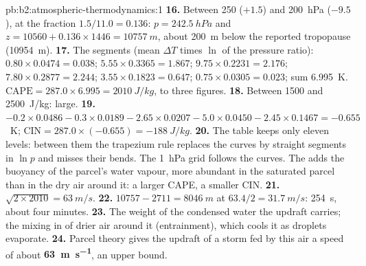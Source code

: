 \begin{solution}{pb:b2:atmospheric-thermodynamics:1}
\textbf{16.} Between 250 ($+1.5$) and \qty{200}{hPa} ($-9.5$), at the fraction $1.5/11.0 =
0.136$: $p = \qty{242.5}{hPa}$ and $z = 10560 + 0.136 \times 1446 = \qty{10757}{m}$, about
\qty{200}{m} below the reported tropopause (\qty{10954}{m}).
\textbf{17.} The segments (mean $\Delta T$ times $\ln$ of the pressure ratio): $0.80 \times 0.0474
= 0.038$; $5.55 \times 0.3365 = 1.867$; $9.75 \times 0.2231 = 2.176$; $7.80 \times 0.2877 =
2.244$; $3.55 \times 0.1823 = 0.647$; $0.75 \times 0.0305 = 0.023$; sum \qty{6.995}{K}.
$\text{CAPE} = 287.0 \times 6.995 = \qty{2010}{J/kg}$, to three figures.
\textbf{18.} Between 1500 and \qty{2500}{J/kg}: large.
\textbf{19.} $-0.2 \times 0.0486 - 0.3 \times 0.0189 - 2.65 \times 0.0207 - 5.0 \times 0.0450 -
2.45 \times 0.1467 = -0.655$~\unit{K}; $\text{CIN} = 287.0 \times (-0.655) = \qty{-188}{J/kg}$.
\textbf{20.} The table keeps only eleven levels: between them the trapezium rule replaces the
curves by straight segments in $\ln p$ and misses their bends. The \qty{1}{hPa} grid follows the curves. The 
adds the buoyancy of the parcel's water vapour, more abundant in the saturated parcel than in
the dry air around it: a larger CAPE, a smaller CIN.
\textbf{21.} $\sqrt{2 \times 2010} = \qty{63}{m/s}$.
\textbf{22.} $10757 - 2711 = \qty{8046}{m}$ at $63.4/2 = \qty{31.7}{m/s}$: \qty{254}{s}, about four
minutes.
\textbf{23.} The weight of the condensed water the updraft carries; the mixing in of drier air
around it (entrainment), which cools it as droplets evaporate.
\textbf{24.} Parcel theory gives the updraft of a storm fed by this air a speed of about
\textbf{\qty[text-series-to-math=true]{63}{m.s^{-1}}}, an upper bound.
\end{solution}
